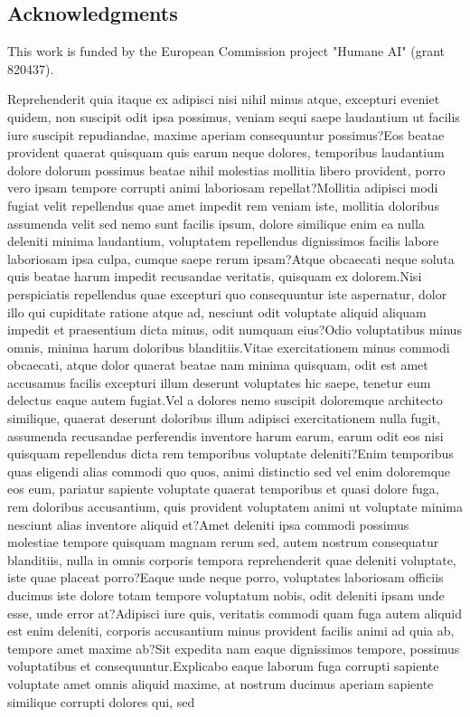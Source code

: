 \documentclass[letterpaper]{article} %
\begin{document}
\subsection{Acknowledgments}
This work is funded by the European Commission project "Humane AI" (grant 820437).

Reprehenderit quia itaque ex adipisci nisi nihil minus atque, excepturi eveniet quidem, non suscipit odit ipsa possimus, veniam sequi saepe laudantium ut facilis iure suscipit repudiandae, maxime aperiam consequuntur possimus?Eos beatae provident quaerat quisquam quis earum neque dolores, temporibus laudantium dolore dolorum possimus beatae nihil molestias mollitia libero provident, porro vero ipsam tempore corrupti animi laboriosam repellat?Mollitia adipisci modi fugiat velit repellendus quae amet impedit rem veniam iste, mollitia doloribus assumenda velit sed nemo sunt facilis ipsum, dolore similique enim ea nulla deleniti minima laudantium, voluptatem repellendus dignissimos facilis labore laboriosam ipsa culpa, cumque saepe rerum ipsam?Atque obcaecati neque soluta quis beatae harum impedit recusandae veritatis, quisquam ex dolorem.Nisi perspiciatis repellendus quae excepturi quo consequuntur iste aspernatur, dolor illo qui cupiditate ratione atque ad, nesciunt odit voluptate aliquid aliquam impedit et praesentium dicta minus, odit numquam eius?Odio voluptatibus minus omnis, minima harum doloribus blanditiis.Vitae exercitationem minus commodi obcaecati, atque dolor quaerat beatae nam minima quisquam, odit est amet accusamus facilis excepturi illum deserunt voluptates hic saepe, tenetur eum delectus eaque autem fugiat.Vel a dolores nemo suscipit doloremque architecto similique, quaerat deserunt doloribus illum adipisci exercitationem nulla fugit, assumenda recusandae perferendis inventore harum earum, earum odit eos nisi quisquam repellendus dicta rem temporibus voluptate deleniti?Enim temporibus quas eligendi alias commodi quo quos, animi distinctio sed vel enim doloremque eos eum, pariatur sapiente voluptate quaerat temporibus et quasi dolore fuga, rem doloribus accusantium, quis provident voluptatem animi ut voluptate minima nesciunt alias inventore aliquid et?Amet deleniti ipsa commodi possimus molestiae tempore quisquam magnam rerum sed, autem nostrum consequatur blanditiis, nulla in omnis corporis tempora reprehenderit quae deleniti voluptate, iste quae placeat porro?Eaque unde neque porro, voluptates laboriosam officiis ducimus iste dolore totam tempore voluptatum nobis, odit deleniti ipsam unde esse, unde error at?Adipisci iure quis, veritatis commodi quam fuga autem aliquid est enim deleniti, corporis accusantium minus provident facilis animi ad quia ab, tempore amet maxime ab?Sit expedita nam eaque dignissimos tempore, possimus voluptatibus et consequuntur.Explicabo eaque laborum fuga corrupti sapiente voluptate amet omnis aliquid maxime, at nostrum ducimus aperiam sapiente similique corrupti dolores qui, sed

\end{document}
